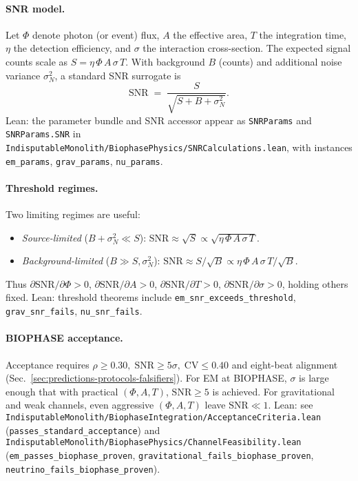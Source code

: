 \documentclass[12pt,a4paper]{article}
\begin{document}
\paragraph{SNR model.}
Let \(\Phi\) denote photon (or event) flux, \(A\) the effective area, \(T\) the integration time, \(\eta\) the detection efficiency, and \(\sigma\) the interaction cross-section. The expected signal counts scale as
\(
  S=\eta\,\Phi\,A\,\sigma\,T.
\)
With background \(B\) (counts) and additional noise variance \(\sigma_{N}^{2}\), a standard SNR surrogate is
\begin{equation}
  \mathrm{SNR}
  \;=\;
  \frac{S}{\sqrt{S + B + \sigma_{N}^{2}}}.
  \label{eq:snr-def}
\end{equation}
Lean: the parameter bundle and SNR accessor appear as \texttt{SNRParams} and \texttt{SNRParams.SNR} in
\texttt{IndisputableMonolith/BiophasePhysics/SNRCalculations.lean}, with instances
\texttt{em\_params}, \texttt{grav\_params}, \texttt{nu\_params}.

\paragraph{Threshold regimes.}
Two limiting regimes are useful:
\begin{itemize}
  \item \emph{Source-limited} (\(B+\sigma_{N}^{2}\ll S\)):
    \(
      \mathrm{SNR}\approx \sqrt{S}\propto \sqrt{\eta\,\Phi\,A\,\sigma\,T}.
    \)
  \item \emph{Background-limited} (\(B\gg S,\sigma_{N}^{2}\)):
    \(
      \mathrm{SNR}\approx S/\sqrt{B}\propto \eta\,\Phi\,A\,\sigma\,T/\sqrt{B}.
    \)
\end{itemize}
Thus \(\partial\mathrm{SNR}/\partial \Phi>0\), \(\partial\mathrm{SNR}/\partial A>0\), \(\partial\mathrm{SNR}/\partial T>0\), \(\partial\mathrm{SNR}/\partial \sigma>0\), holding others fixed. Lean: threshold theorems include
\texttt{em\_snr\_exceeds\_threshold}, \texttt{grav\_snr\_fails}, \texttt{nu\_snr\_fails}.

\paragraph{BIOPHASE acceptance.}
Acceptance requires
\(
  \rho\ge 0.30,\;
  \mathrm{SNR}\ge 5\sigma,\;
  \mathrm{CV}\le 0.40
\)
and eight-beat alignment (Sec.~\ref{sec:predictions-protocols-falsifiers}). For EM at BIOPHASE, \(\sigma\) is large enough that with practical \((\Phi,A,T)\), \(\mathrm{SNR}\ge 5\) is achieved. For gravitational and weak channels, even aggressive \((\Phi,A,T)\) leave \(\mathrm{SNR}\ll 1\). Lean: see
\texttt{IndisputableMonolith/BiophaseIntegration/AcceptanceCriteria.lean}
(\texttt{passes\_standard\_acceptance}) and
\texttt{IndisputableMonolith/BiophasePhysics/ChannelFeasibility.lean}
(\texttt{em\_passes\_biophase\_proven}, \texttt{gravitational\_fails\_biophase\_proven}, \texttt{neutrino\_fails\_biophase\_proven}).
\end{document}
